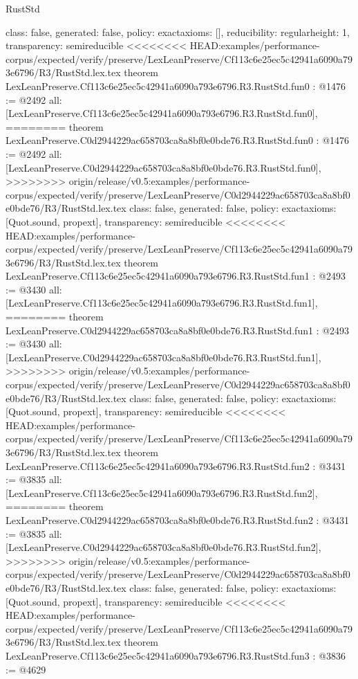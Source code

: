 \begin{lexlean}{RustStd}
\begin{coremodule}
{\begin{coremodule}
{{{  class: false,
  generated: false,
  policy: exact{axioms: []},
  reducibility: regular{height: 1},
  transparency: semireducible
}
<<<<<<<< HEAD:examples/performance-corpus/expected/verify/preserve/LexLeanPreserve/Cf113c6e25ec5c42941a6090a793e6796/R3/RustStd.lex.tex
theorem LexLeanPreserve.Cf113c6e25ec5c42941a6090a793e6796.R3.RustStd.fun0 : @1476 := @2492 {
  all: [LexLeanPreserve.Cf113c6e25ec5c42941a6090a793e6796.R3.RustStd.fun0],
========
theorem LexLeanPreserve.C0d2944229ac658703ca8a8bf0e0bde76.R3.RustStd.fun0 : @1476 := @2492 {
  all: [LexLeanPreserve.C0d2944229ac658703ca8a8bf0e0bde76.R3.RustStd.fun0],
>>>>>>>> origin/release/v0.5:examples/performance-corpus/expected/verify/preserve/LexLeanPreserve/C0d2944229ac658703ca8a8bf0e0bde76/R3/RustStd.lex.tex
  class: false,
  generated: false,
  policy: exact{axioms: [Quot.sound, propext]},
  transparency: semireducible
}
<<<<<<<< HEAD:examples/performance-corpus/expected/verify/preserve/LexLeanPreserve/Cf113c6e25ec5c42941a6090a793e6796/R3/RustStd.lex.tex
theorem LexLeanPreserve.Cf113c6e25ec5c42941a6090a793e6796.R3.RustStd.fun1 : @2493 := @3430 {
  all: [LexLeanPreserve.Cf113c6e25ec5c42941a6090a793e6796.R3.RustStd.fun1],
========
theorem LexLeanPreserve.C0d2944229ac658703ca8a8bf0e0bde76.R3.RustStd.fun1 : @2493 := @3430 {
  all: [LexLeanPreserve.C0d2944229ac658703ca8a8bf0e0bde76.R3.RustStd.fun1],
>>>>>>>> origin/release/v0.5:examples/performance-corpus/expected/verify/preserve/LexLeanPreserve/C0d2944229ac658703ca8a8bf0e0bde76/R3/RustStd.lex.tex
  class: false,
  generated: false,
  policy: exact{axioms: [Quot.sound, propext]},
  transparency: semireducible
}
<<<<<<<< HEAD:examples/performance-corpus/expected/verify/preserve/LexLeanPreserve/Cf113c6e25ec5c42941a6090a793e6796/R3/RustStd.lex.tex
theorem LexLeanPreserve.Cf113c6e25ec5c42941a6090a793e6796.R3.RustStd.fun2 : @3431 := @3835 {
  all: [LexLeanPreserve.Cf113c6e25ec5c42941a6090a793e6796.R3.RustStd.fun2],
========
theorem LexLeanPreserve.C0d2944229ac658703ca8a8bf0e0bde76.R3.RustStd.fun2 : @3431 := @3835 {
  all: [LexLeanPreserve.C0d2944229ac658703ca8a8bf0e0bde76.R3.RustStd.fun2],
>>>>>>>> origin/release/v0.5:examples/performance-corpus/expected/verify/preserve/LexLeanPreserve/C0d2944229ac658703ca8a8bf0e0bde76/R3/RustStd.lex.tex
  class: false,
  generated: false,
  policy: exact{axioms: [Quot.sound, propext]},
  transparency: semireducible
}
<<<<<<<< HEAD:examples/performance-corpus/expected/verify/preserve/LexLeanPreserve/Cf113c6e25ec5c42941a6090a793e6796/R3/RustStd.lex.tex
theorem LexLeanPreserve.Cf113c6e25ec5c42941a6090a793e6796.R3.RustStd.fun3 : @3836 := @4629 {
}}}}}}
\end{coremodule}}
\end{coremodule}
\end{lexlean}
